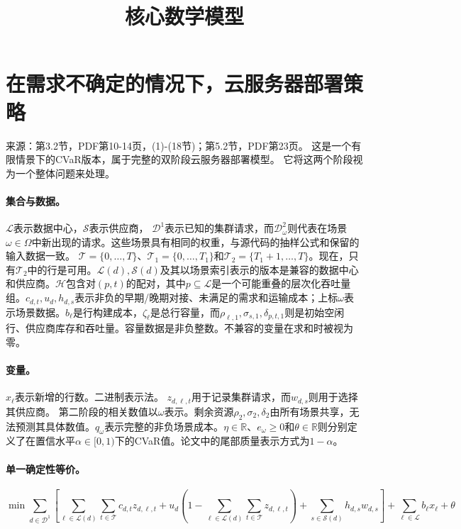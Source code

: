 \documentclass{article}
\title{核心数学模型}
\date{}
\begin{document}
\maketitle

\section*{在需求不确定的情况下，云服务器部署策略}

来源：第3.2节，PDF第10-14页，(1)-(18节)；第5.2节，PDF第23页。
这是一个有限情景下的CVaR版本，属于完整的双阶段云服务器部署模型。 它将这两个阶段视为一个整体问题来处理。

\paragraph{集合与数据。}
$\mathcal L$表示数据中心，$\mathcal S$表示供应商，
$\mathcal D^1$表示已知的集群请求，而$\mathcal D^2_\omega$则代表在场景$\omega\in\Omega$中新出现的请求。这些场景具有相同的权重，与源代码的抽样公式和保留的输入数据一致。
$\mathcal T=\{0,\ldots,T\}$、$\mathcal T_1=\{0,\ldots,T_1\}$和$\mathcal T_2=\{T_1+1,\ldots,T\}$。现在，只有$\mathcal T_2$中的行是可用。$\mathcal L(d),\mathcal S(d)$及其以场景索引表示的版本是兼容的数据中心和供应商。$\mathcal H$包含对$(p,t)$的配对，其中$p\subseteq\mathcal L$是一个可能重叠的层次化吞吐量组。$c_{d,t},u_d,h_{d,s}$表示非负的早期/晚期对接、未满足的需求和运输成本；上标$\omega$表示场景数据。$b_\ell$是行构建成本，$\zeta_\ell$是总行容量，而$\rho_{\ell,1},\sigma_{s,1},
\delta_{p,t,1}$则是初始空闲行、供应商库存和吞吐量。容量数据是非负整数。不兼容的变量在求和时被视为零。

\paragraph{变量。}
$x_\ell$表示新增的行数。二进制表示法。  
$z_{d,\ell,t}$用于记录集群请求，而$w_{d,s}$则用于选择其供应商。  
第二阶段的相关数值以$\omega$表示。剩余资源$\rho_2,\sigma_2,\delta_2$由所有场景共享，无法预测其具体数值。$q_\omega$表示完整的非负场景成本。$\eta\in\mathbb R$、$e_\omega\ge0$和$\theta\in\mathbb R$则分别定义了在置信水平$\alpha\in[0,1)$下的CVaR值。论文中的尾部质量表示方式为$1-\alpha$。

\paragraph{单一确定性等价。}
\begin{equation}
\min
\sum_{d\in \mathcal{D}^1}
\left[
\sum_{\ell\in \mathcal{L}(d)} \sum_{t\in \mathcal{T}} c_{d,t} z_{d,\ell,t}
+ u_d \left(1 - \sum_{\ell\in \mathcal{L}(d)} \sum_{t\in \mathcal{T}} z_{d,\ell,t}\right)
+ \sum_{s\in \mathcal{S}(d)} h_{d,s} w_{d,s}
\right]
+ \sum_{\ell\in \mathcal{L}} b_\ell x_\ell
+ \theta
\tag{1}
\end{equation}
\end{document}
